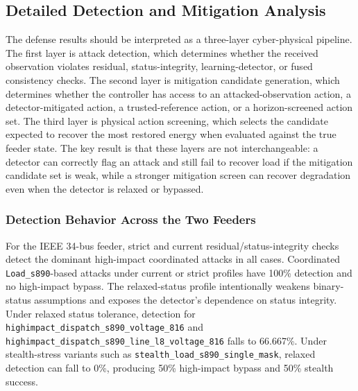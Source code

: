 
\subsection{Detailed Detection and Mitigation Analysis}
\label{subsec:detailed_detection_mitigation}

The defense results should be interpreted as a three-layer cyber-physical pipeline. The first layer is attack detection, which determines whether the received observation violates residual, status-integrity, learning-detector, or fused consistency checks. The second layer is mitigation candidate generation, which determines whether the controller has access to an attacked-observation action, a detector-mitigated action, a trusted-reference action, or a horizon-screened action set. The third layer is physical action screening, which selects the candidate expected to recover the most restored energy when evaluated against the true feeder state. The key result is that these layers are not interchangeable: a detector can correctly flag an attack and still fail to recover load if the mitigation candidate set is weak, while a stronger mitigation screen can recover degradation even when the detector is relaxed or bypassed.

\subsubsection{Detection Behavior Across the Two Feeders}
\label{subsubsec:detection_behavior}

For the IEEE 34-bus feeder, strict and current residual/status-integrity checks detect the dominant high-impact coordinated attacks in all cases. Coordinated \texttt{Load\_s890}-based attacks under current or strict profiles have 100\% detection and no high-impact bypass. The relaxed-status profile intentionally weakens binary-status assumptions and exposes the detector's dependence on status integrity. Under relaxed status tolerance, detection for \texttt{highimpact\_dispatch\_s890\_voltage\_816} and \texttt{highimpact\_dispatch\_s890\_line\_l8\_voltage\_816} falls to 66.667\%. Under stealth-stress variants such as \texttt{stealth\_load\_s890\_single\_mask}, relaxed detection can fall to 0\%, producing 50\% high-impact bypass and 50\% stealth success.

